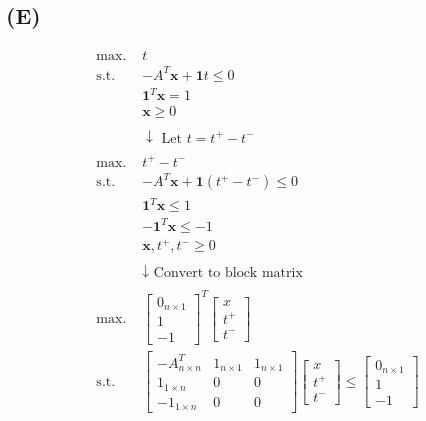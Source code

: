 \documentclass[12pt]{article}
\begin{document}
\subsection*{(E)}
\begin{align*}
    \text{max. } & t \\
    \text{s.t. } & -A^T \mathbf{x} + \mathbf{1}t \leq 0 \\
    & \mathbf{1}^T \mathbf{x} = 1 \\
    & \mathbf{x} \geq 0 \\
    \\
    & \downarrow \text{ Let $t=t^+ - t^-$}\\
    \\
    \text{max. } & t^+ - t^- \\
    \text{s.t. } & -A^T \mathbf{x} + \mathbf{1}(t^+ - t^-) \leq 0 \\
    & \mathbf{1}^T \mathbf{x} \leq 1 \\
    & -\mathbf{1}^T \mathbf{x} \leq -1 \\
    & \mathbf{x}, t^+, t^- \geq 0 \\
    \\
    & \downarrow \text{ Convert to block matrix} \\
    \\
    \text{max. } & \begin{bmatrix} 0_{n \times 1} \\ 1 \\ -1 \end{bmatrix}^T \begin{bmatrix} x \\ t^+ \\ t^- \end{bmatrix} \\
    \text{s.t. } & \begin{bmatrix} -A^T_{n \times n} & 1_{n \times 1} & 1_{n \times 1} \\ 1_{1 \times n} & 0 & 0 \\ -1_{1 \times n} & 0 & 0 \end{bmatrix} \begin{bmatrix} x \\ t^+ \\ t^- \end{bmatrix} \leq \begin{bmatrix} 0_{n \times 1} \\ 1 \\ -1 \end{bmatrix} \\
    \\

\end{align*}
\end{document}
